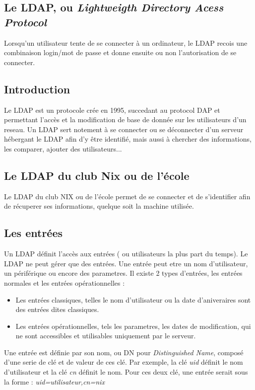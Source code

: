 \usepackage[french]{babel}
\subsection{Le LDAP, ou \textit{Lightweigth Directory Acess Protocol}}
Lorsqu'un utilisateur tente de se connecter à un ordinateur, le LDAP recois une combinaison login/mot de passe et donne ensuite ou non l'autorisation de se connecter.
\subsection{Introduction}
Le LDAP est un protocole crée en 1995, succedant au protocol DAP et permettant l'accès et la modification de base de donnée sur les utilisateurs d'un reseau. Un LDAP sert notement à se connecter ou se déconnecter d'un serveur hébergant le LDAP afin d'y être identifié, mais aussi à chercher des informations, les comparer, ajouter des utilisateurs...
\subsection{Le LDAP du club Nix ou de l'école}
Le LDAP du club NIX ou de l'école permet de se connecter et de s'identifier afin de récuperer ses informations, quelque soit la machine utilisée.
\subsection{Les entrées}
Un LDAP définit l'accès aux entrées ( ou utilisateurs la plus part du temps).
Le LDAP ne peut gérer que des entrées. Une entrée peut etre un nom d'utilisateur, un périférique ou encore des parametres. Il existe 2 types d'entrées, les entrées normales et les entrées opérationnelles :
\begin{itemize}
    \item Les entrées classiques, telles le nom d'utilisateur ou la date d'aniveraires sont des entrées dites classiques.
    \item Les entrées opérationnelles, tels les parametres, les dates de modification, qui ne sont accessibles et utilisables uniquement par le serveur.
\end{itemize}
Une entrée est définie par son nom, ou DN pour \textit{Distinguished Name}, composé d'une serie de clé et de valeur de ces clé. Par exemple, la clé \textit{uid} définit le nom d'utilisateur et la clé \textit{cn} définit le nom. Pour ces deux clé, une entrée serait sous la forme : \textit{uid=utilisateur,cn=nix}
